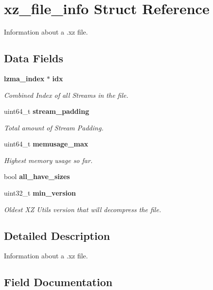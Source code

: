 \section{xz\-\_\-file\-\_\-info Struct Reference}
\label{structxz__file__info}


Information about a .xz file.  


\subsection*{Data Fields}
\begin{DoxyCompactItemize}
\item 
{\bf lzma\-\_\-index} $\ast$ {\bf idx}
\begin{DoxyCompactList}\small\item\em Combined Index of all Streams in the file. \end{DoxyCompactList}\item 
uint64\-\_\-t {\bf stream\-\_\-padding}
\begin{DoxyCompactList}\small\item\em Total amount of Stream Padding. \end{DoxyCompactList}\item 
uint64\-\_\-t {\bf memusage\-\_\-max}
\begin{DoxyCompactList}\small\item\em Highest memory usage so far. \end{DoxyCompactList}\item 
bool {\bf all\-\_\-have\-\_\-sizes}
\item 
uint32\-\_\-t {\bf min\-\_\-version}
\begin{DoxyCompactList}\small\item\em Oldest X\-Z Utils version that will decompress the file. \end{DoxyCompactList}\end{DoxyCompactItemize}


\subsection{Detailed Description}
Information about a .xz file. 

\subsection{Field Documentation}
